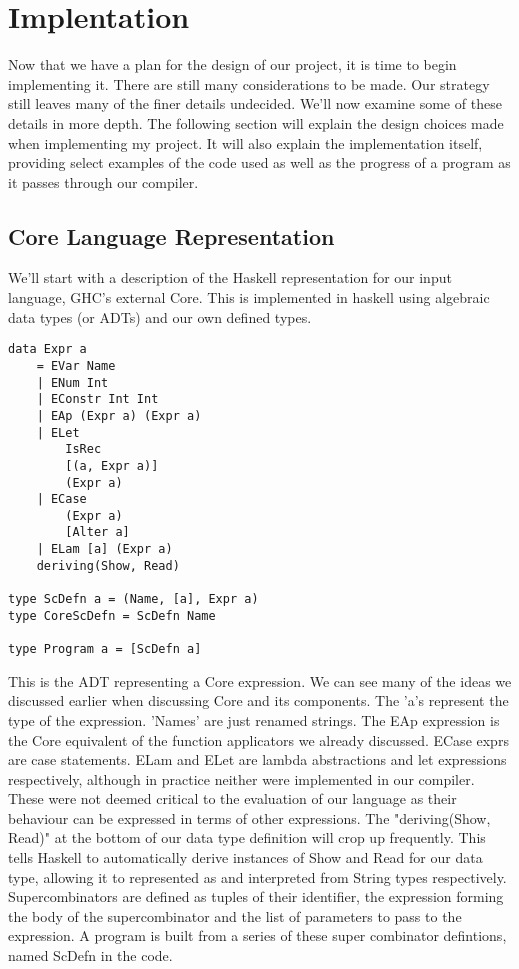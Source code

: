\section{Implentation}
Now that we have a plan for the design of our project, it is time
to begin implementing it. There are still many considerations to
be made. Our strategy still leaves many of the finer details 
undecided. We'll now examine some of these details in more depth.
The following section will explain the design choices made when
implementing my project. It will also explain the implementation
itself, providing select examples of the code used as well as the
progress of a program as it passes through our compiler.

\subsection{Core Language Representation}
We'll start with a description of the Haskell representation for
our input language, GHC's external Core. This is implemented in
haskell using algebraic data types (or ADTs) and our own defined
types.

\begin{verbatim}
data Expr a 
	= EVar Name
	| ENum Int
	| EConstr Int Int
	| EAp (Expr a) (Expr a)
	| ELet 
		IsRec
		[(a, Expr a)]
		(Expr a)
	| ECase
		(Expr a)
		[Alter a]
	| ELam [a] (Expr a)
	deriving(Show, Read)

type ScDefn a = (Name, [a], Expr a)
type CoreScDefn = ScDefn Name

type Program a = [ScDefn a]
\end{verbatim}

\noindent This is the ADT representing a Core expression. We can
see many of the ideas we discussed earlier when discussing Core
and its components. The 'a's represent the type of the expression.
'Names' are just renamed strings. The EAp expression is the Core
equivalent of the function applicators we already discussed. ECase
exprs are case statements. ELam and ELet are lambda abstractions
and let expressions respectively, although in practice neither 
were implemented in our compiler. These were not deemed critical
to the evaluation of our language as their behaviour can be 
expressed in terms of other expressions. The "deriving(Show, Read)"
at the bottom of our data type definition will crop up frequently.
This tells Haskell to automatically derive instances of Show and
Read for our data type, allowing it to represented as and
interpreted from String types respectively. Supercombinators
are defined as tuples of their identifier,
the expression forming the body of the supercombinator and the 
list of parameters to pass to the expression. A program is
built from a series of these super combinator defintions,
named ScDefn in the code. 

